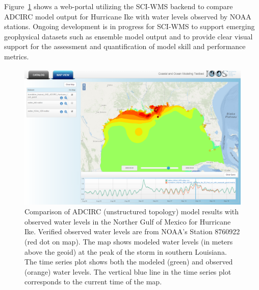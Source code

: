 \documentclass[11pt,twocolumn,twoside]{IEEEtran}
\newcommand{\sciwms}{SCI-WMS}
\begin{document}
Figure~\ref{fig:adcirc_comp} shows a web-portal utilizing the
\sciwms{} backend to compare ADCIRC model output for Hurricane Ike
with water levels observed by NOAA stations. Ongoing development is in
progress for \sciwms{} to support emerging geophysical datasets such
as ensemble model output and to provide clear visual support for
the assessment and quantification of model skill and performance
metrics.
\begin{figure}[ht!]
  \centering
  \includegraphics[width=\columnwidth]{./figs/SciWMS_ModelObsComparison}
  \caption{Comparison of ADCIRC (unstructured topology) model results
    with observed water levels in the Norther Gulf of Mexico for
    Hurricane Ike. Verified observed water levels are from NOAA's
    Station 8760922 (red dot on map). The map shows modeled water
    levels (in meters above the geoid) at the peak of the storm in
    southern Louisiana. The time series plot shows both the modeled
    (green) and observed (orange) water levels. The vertical blue line
    in the time series plot corresponds to the current time of the
    map.}
  \label{fig:adcirc_comp}
\end{figure}


\end{document}
